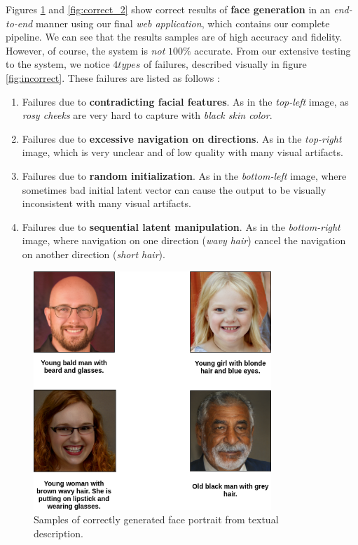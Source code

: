 Figures \ref{fig:correct_1} and \ref{fig:correct_2} show correct results of \textbf{face generation} in an \emph{end-to-end} manner using our final \emph{web application}, which contains our complete pipeline. We can see that the results samples are of high accuracy and fidelity. However, of course, the system is \emph{not} $100\%$ accurate. From our extensive testing to the system, we notice $4 types$ of failures, described visually in figure \ref{fig:incorrect}. These failures are listed as follows :
\begin{enumerate}
    \item Failures due to \textbf{contradicting facial features}. As in the \emph{top-left} image, as \emph{rosy cheeks} are very hard to capture with \emph{black skin color}.
    \item Failures due to \textbf{excessive navigation on directions}. As in the \emph{top-right} image, which is very unclear and of low quality with many visual artifacts.
    \item Failures due to \textbf{random initialization}. As in the \emph{bottom-left} image, where sometimes bad initial latent vector can cause the output to be visually inconsistent with many visual artifacts.
    \item Failures due to \textbf{sequential latent manipulation}. As in the \emph{bottom-right} image, where navigation on one direction (\emph{wavy hair}) cancel the navigation on another direction (\emph{short hair}).
\end{enumerate}

\begin{figure}[H]
    \centering
    \includegraphics[width=0.8\textwidth]{images/correct-results_1.png}
    \caption{Samples of correctly generated face portrait from textual description.}
    \label{fig:correct_1}
\end{figure}

